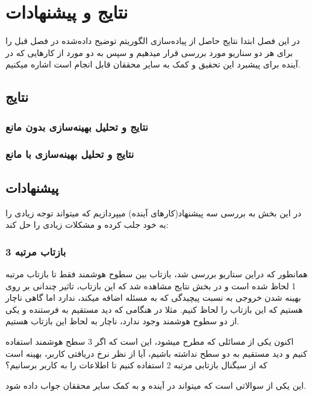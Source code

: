 \chapter{نتایج و پیشنهادات}
در این فصل ابتدا نتایج حاصل از پیاده‌سازی الگوریتم توضیح داده‌شده در فصل قبل را برای هر دو سناریو مورد بررسی قرار میدهیم و سپس به دو مورد از کارهایی که در آینده برای پیشبرد این تحقیق و کمک به سایر محققان قابل انجام است اشاره میکنیم.
\newpage
\section{نتایج}

\subsection{نتایج و تحلیل بهینه‌سازی بدون مانع}

\subsection{نتایج و تحلیل بهینه‌سازی با مانع}

\section{پیشنهادات}

در این بخش به بررسی سه پیشنهاد(کارهای آینده) میپردازیم که میتواند توجه زیادی را به خود جلب کرده و مشکلات زیادی را حل کند:

\subsection{بازتاب مرتبه 3}

همانطور که دراین ستاریو بررسی شد، بازتاب بین سطوح هوشمند فقط تا بازتاب مرتبه 1 لحاظ شده است و در بخش نتایج مشاهده شد که این بازتاب، تاثیر چندانی بر روی بهینه شدن خروجی به نسبت پیچیدگی که به مسئله اضافه میکند، ندارد اما گاهی ناچار هستیم که این بازتاب را لحاظ کنیم. مثلا در هنگامی که دید مستقیم به فرستنده و یکی از دو سطوح هوشمند وجود ندارد، ناچار به لحاظ این بازتاب هستیم. 

اکنون یکی از مسائلی که مطرح میشود، این است که اگر 3 سطح هوشمند استفاده کنیم و دید مستقیم به دو سطح نداشته باشیم، آیا از نظر  نرخ دریافتی کاربر، بهینه است که از سیگنال بازتابی مرتبه 2 استفاده کنیم تا اطلاعات را به کاربر برسانیم؟

این یکی از سوالاتی است که میتواند در آینده و به کمک سایر محققان جواب داده شود. 

